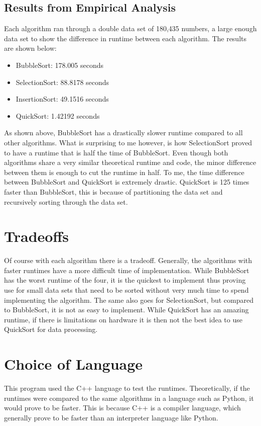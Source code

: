 \documentclass[conference]{IEEEtran}
\begin{document}
\subsection{Results from Empirical Analysis}
Each algorithm ran through a double data set of 180,435 numbers, a large enough data set to show the difference in runtime between each algorithm. The results are shown below:\\

\begin{itemize}
\item BubbleSort: 178.005 seconds
\item SelectionSort:  88.8178 seconds
\item InsertionSort: 49.1516 seconds
\item QuickSort: 1.42192 seconds\\
\end{itemize}

As shown above, BubbleSort has a drastically slower runtime compared to all other algorithms. What is surprising to me however, is how SelectionSort proved to have a runtime that is half the time of BubbleSort. Even though both algorithms share a very similar theoretical runtime and code, the minor difference between them is enough to cut the runtime in half.  To me, the time difference between BubbleSort and QuickSort is extremely drastic. QuickSort is 125 times faster than BubbleSort, this is because of partitioning the data set and recursively sorting through the data set.

\section{Tradeoffs}
Of course with each algorithm there is a tradeoff. Generally, the algorithms with faster runtimes have a more difficult time of implementation. While BubbleSort has the worst runtime of the four, it is the quickest to implement thus proving use for small data sets that need to be sorted without very much time to spend implementing the algorithm. The same also goes for SelectionSort, but compared to BubbleSort, it is not as easy to implement. While QuickSort has an amazing runtime, if there is limitations on hardware it is then not the best idea to use QuickSort for data processing.

\section{Choice of Language}
This program used the C++ language to test the runtimes. Theoretically, if the runtimes were compared to the same algorithms in a language such as Python, it would prove to be faster. This is because C++ is a compiler language, which generally prove to be faster than an interpreter language like Python.
\end{document}
